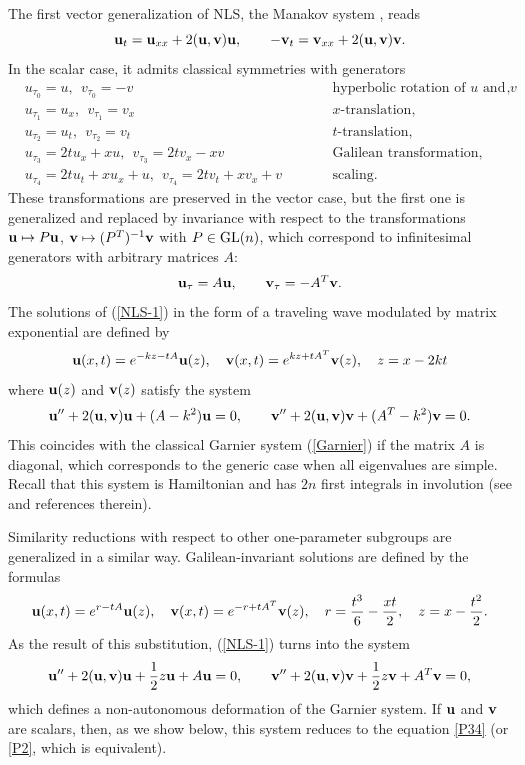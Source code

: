 \documentclass[11pt]{article}
\theoremstyle{plain}
\theoremstyle{definition}
\begin{document}
The first vector generalization of NLS, the Manakov system \cite{Manakov_1973}, reads
\begin{equation}\label{NLS-1}
 {\bf u}_t={\bf u}_{xx}+2({\bf u},{\bf v}){\bf u},\qquad -{\bf v}_t={\bf v}_{xx}+2({\bf u},{\bf v}){\bf v}.
\end{equation}
In the scalar case, it admits classical symmetries with generators
\[
\begin{aligned}
 & u_{\tau_0}=u,~~ v_{\tau_0}=-v && \text{hyperbolic rotation of $u$ and $v$},\\
 & u_{\tau_1}=u_x,~~ v_{\tau_1}=v_x && \text{$x$-translation},\\
 & u_{\tau_2}=u_t,~~ v_{\tau_2}=v_t && \text{$t$-translation},\\
 & u_{\tau_3}=2tu_x+xu,~~ v_{\tau_3}=2tv_x-xv && \text{Galilean transformation},\\
 & u_{\tau_4}=2tu_t+xu_x+u,~~ v_{\tau_4}=2tv_t+xv_x+v &\qquad& \text{scaling}.
\end{aligned}
\]
These transformations are preserved in the vector case, but the first one is generalized and replaced by invariance with respect to the transformations ${\bf u}\mapsto P{\bf u}$, ${\bf v}\mapsto(P^T)^{-1}{\bf v}$ with $P\in{\rm GL}(n)$, which correspond to infinitesimal generators with arbitrary matrices $A$:
\[
 {\bf u}_\tau=A{\bf u},\qquad {\bf v}_\tau=-A^T{\bf v}.
\]
The solutions of (\ref{NLS-1}) in the form of a traveling wave modulated by matrix exponential are defined by
\begin{equation}\label{uv-wave}
 {\bf u}(x,t)=e^{-kz-tA}{\bf u}(z),\quad {\bf v}(x,t)=e^{kz+tA^T}{\bf v}(z),\quad z=x-2kt
\end{equation}
where ${\bf u}(z)$ and ${\bf v}(z)$ satisfy the system
\[
 {\bf u}''+2({\bf u},{\bf v}){\bf u}+(A-k^2){\bf u}=0,\qquad {\bf v}''+2({\bf u},{\bf v}){\bf v}+(A^T-k^2){\bf v}=0.
\]
This coincides with the classical Garnier system (\ref {Garnier}) if the matrix $A$ is diagonal, which corresponds to the generic case when all eigenvalues are simple. Recall that this system is Hamiltonian and has $2n$ first integrals in involution (see \cite{Suris_2003} and references therein).

Similarity reductions with respect to other one-parameter subgroups are generalized in a similar way. Galilean-invariant solutions are defined by the formulas
\begin{equation}\label{uv-Gal}
 {\bf u}(x,t)=e^{r-tA}{\bf u}(z),\quad 
 {\bf v}(x,t)=e^{-r+tA^T}{\bf v}(z),\quad 
 r=\frac{t^3}{6}-\frac{xt}{2},\quad 
 z=x-\frac{t^2}{2}.   
\end{equation}
As the result of this substitution, (\ref{NLS-1}) turns into the system
\begin{equation}\label{Garnier-1}
 {\bf u}''+2({\bf u},{\bf v}){\bf u}+\frac{1}{2}z{\bf u}+A{\bf u}=0,\qquad
 {\bf v}''+2({\bf u},{\bf v}){\bf v}+\frac{1}{2}z{\bf v}+A^T{\bf v}=0,
\end{equation}
which defines a non-autonomous deformation of the Garnier system. If ${\bf u}$ and ${\bf v}$ are scalars, then, as we show below, this system reduces to the equation \ref{P34} (or \ref{P2}, which is equivalent).
\end{document}

